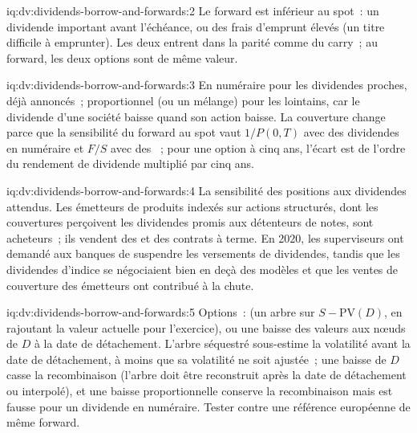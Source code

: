 \begin{solution}{iq:dv:dividends-borrow-and-forwards:2}
Le forward est inférieur au spot~: un dividende important avant l'échéance, ou des frais d'emprunt élevés (un
titre difficile à emprunter). Les deux entrent dans la parité comme du carry~; au forward, les deux options sont
de même valeur.
\end{solution}

\begin{solution}{iq:dv:dividends-borrow-and-forwards:3}
En numéraire pour les dividendes proches, déjà annoncés~; proportionnel (ou un mélange) pour les lointains,
car le dividende d'une société baisse quand son action baisse. La couverture change parce que la
sensibilité du forward au spot vaut $1/P(0,T)$ avec des dividendes en numéraire et $F/S$ avec
des ~; pour une option à cinq ans, l'écart est de l'ordre du rendement de dividende
multiplié par cinq ans.
\end{solution}

\begin{solution}{iq:dv:dividends-borrow-and-forwards:4}
La sensibilité des positions aux dividendes attendus. Les émetteurs de produits indexés sur actions
structurés, dont les couvertures perçoivent les dividendes promis aux détenteurs de notes,
sont acheteurs~; ils vendent des  et des contrats à terme. En 2020, les superviseurs ont demandé aux banques de suspendre
les versements de dividendes, tandis que les dividendes d'indice se négociaient bien en deçà des modèles et que les ventes de couverture des émetteurs
ont contribué à la chute.
\end{solution}

\begin{solution}{iq:dv:dividends-borrow-and-forwards:5}
Options~:  (un arbre sur $S-\mathrm{PV}(D)$, en rajoutant la valeur actuelle pour l'exercice), ou une
baisse des valeurs aux nœuds de $D$ à la date de détachement. L'arbre séquestré sous-estime la
volatilité avant la date de détachement, à moins que sa volatilité ne soit ajustée~; une baisse de $D$ casse
la recombinaison (l'arbre doit être reconstruit après la date de détachement ou interpolé), et une
baisse proportionnelle conserve la recombinaison mais est fausse pour un dividende en numéraire. Tester contre une
référence européenne de même forward.
\end{solution}

